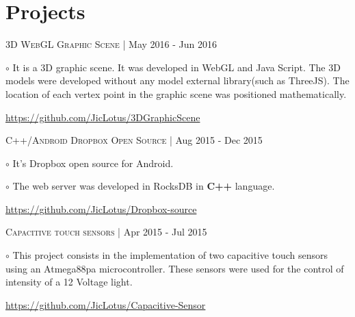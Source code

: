 \documentclass[letterpaper]{article}
\renewenvironment{itemize}{
  \begin{list}{}{
    \setlength{\leftmargin}{1.5em}
  }
}{
  \end{list}
}
\newenvironment{no-indent-itemize}{
  \begin{list}{}{
    \setlength{\leftmargin}{0em}
  }
}{
  \end{list}
}
\def\bullet{$\circ$\xspace}
\begin{document}
\section*{Projects}
\begin{no-indent-itemize}
    
    \item \textsc{3D WebGL Graphic Scene} | May 2016 - Jun 2016
    \begin{itemize}
    \item\bullet It is a 3D graphic scene. It was developed in WebGL and Java Script. The 3D models were developed without any model external library(such as ThreeJS). The location of each vertex point in the graphic scene was positioned mathematically.
    \end{itemize}
    \begin{itemize}
    \item \href{https://github.com/JicLotus/3DGraphicScene}{https://github.com/JicLotus/3DGraphicScene}
    
    \end{itemize}

    \item \textsc{C++/Android Dropbox Open Source} | Aug 2015 - Dec 2015
    \begin{itemize}
        \item\bullet It's Dropbox open source for Android.
        \item\bullet The web server was developed in RocksDB in \textbf{C++} language.
        \end{itemize}    
    \begin{itemize}
        \item \href{https://github.com/JicLotus/Dropbox-source}{https://github.com/JicLotus/Dropbox-source}
    \end{itemize}

    \item \textsc{Capacitive touch sensors} |  Apr 2015 - Jul 2015

    \begin{itemize}
        \item\bullet This project consists in the implementation of two capacitive touch sensors using an Atmega88pa microcontroller. These sensors were used for the control of intensity of a 12 Voltage light.
         
         \href{https://github.com/JicLotus/Capacitive-Sensor}{https://github.com/JicLotus/Capacitive-Sensor}
    \end{itemize}

\end{no-indent-itemize}
\end{document}
